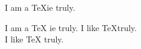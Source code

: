 \documentclass{article}
\begin{document}
I am a \TeX ie truly.

I am a \TeX{} ie truly.
I like \TeX truly. \\
I like \TeX{} truly.
\end{document}
